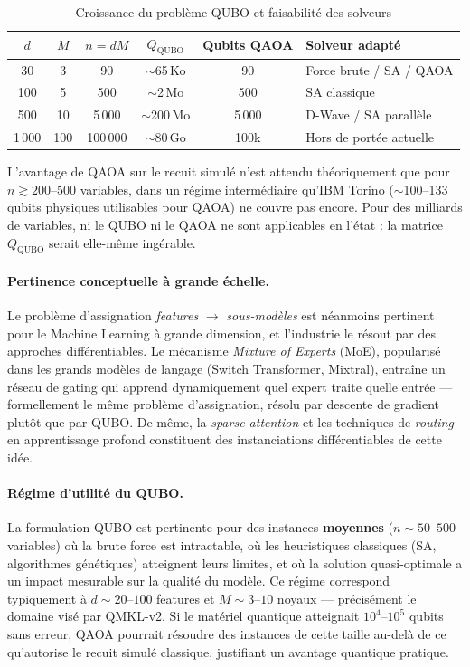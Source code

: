 \documentclass[12pt,a4paper]{article}
\begin{document}
\begin{table}[H]
\centering
\caption{Croissance du problème QUBO et faisabilité des solveurs}
\label{tab:qubo_scale}
\begin{tabular}{@{}cccccl@{}}
\toprule
$d$ & $M$ & $n = dM$ & $Q_{\mathrm{QUBO}}$ & Qubits QAOA & Solveur adapté \\
\midrule
30   & 3   & 90        & $\sim$65\,Ko       & 90          & Force brute / SA / QAOA \\
100  & 5   & 500       & $\sim$2\,Mo        & 500         & SA classique \\
500  & 10  & 5\,000    & $\sim$200\,Mo      & 5\,000      & D-Wave / SA parallèle \\
1\,000 & 100 & 100\,000 & $\sim$80\,Go      & 100k        & Hors de portée actuelle \\
\bottomrule
\end{tabular}
\end{table}

L'avantage de QAOA sur le recuit simulé n'est attendu théoriquement que pour
$n \gtrsim 200$--$500$ variables, dans un régime intermédiaire qu'IBM Torino
($\sim$100--133 qubits physiques utilisables pour QAOA) ne couvre pas encore.
Pour des milliards de variables, ni le QUBO ni le QAOA ne sont applicables en
l'état : la matrice $Q_{\mathrm{QUBO}}$ serait elle-même ingérable.

\paragraph{Pertinence conceptuelle à grande échelle.}
Le problème d'assignation \emph{features} $\to$ \emph{sous-modèles} est
néanmoins pertinent pour le Machine Learning à grande dimension, et l'industrie
le résout par des approches différentiables.
Le mécanisme \emph{Mixture of Experts} (MoE), popularisé dans les grands modèles
de langage (Switch Transformer, Mixtral), entraîne un réseau de gating qui
apprend dynamiquement quel expert traite quelle entrée — formellement le même
problème d'assignation, résolu par descente de gradient plutôt que par QUBO.
De même, la \emph{sparse attention} et les techniques de \emph{routing} en
apprentissage profond constituent des instanciations différentiables de cette idée.

\paragraph{Régime d'utilité du QUBO.}
La formulation QUBO est pertinente pour des instances \textbf{moyennes}
($n \sim 50$--$500$ variables) où la brute force est intractable, où les
heuristiques classiques (SA, algorithmes génétiques) atteignent leurs limites,
et où la solution quasi-optimale a un impact mesurable sur la qualité du modèle.
Ce régime correspond typiquement à $d \sim 20$--$100$ features et $M \sim 3$--$10$
noyaux --- précisément le domaine visé par QMKL-v2.
Si le matériel quantique atteignait $10^4$--$10^5$ qubits sans erreur, QAOA
pourrait résoudre des instances de cette taille au-delà de ce qu'autorise le
recuit simulé classique, justifiant un avantage quantique pratique.
\end{document}
